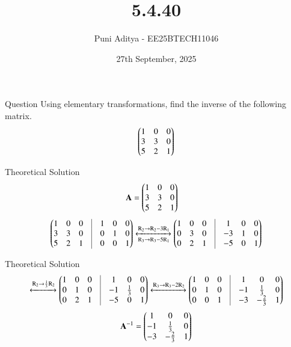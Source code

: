 \documentclass{beamer}
\title{5.4.40}
\date{27th September, 2025}
\author{Puni Aditya - EE25BTECH11046}
\begin{document}
\frame{\titlepage}
\begin{frame}{Question}
Using elementary transformations, find the inverse of the following matrix.
\begin{align*}
    \begin{pmatrix}1 & 0 & 0 \\ 3 & 3 & 0 \\ 5 & 2 & 1\end{pmatrix}
\end{align*}
\end{frame}

\begin{frame}{Theoretical Solution}
\begin{align}
    \mathbf{A} &= \begin{pmatrix}1 & 0 & 0 \\ 3 & 3 & 0 \\ 5 & 2 & 1\end{pmatrix}
\end{align}
\begin{align}
    \myvec{
        1 & 0 & 0 & \vrule & 1 & 0 & 0 \\
        3 & 3 & 0 & \vrule & 0 & 1 & 0 \\
        5 & 2 & 1 & \vrule & 0 & 0 & 1
    }
    \xleftrightarrow[\text{R}_3 \to \text{R}_3 - 5\text{R}_1]{\text{R}_2 \to \text{R}_2 - 3\text{R}_1}
    \myvec{
        1 & 0 & 0 & \vrule & 1 & 0 & 0 \\
        0 & 3 & 0 & \vrule & -3 & 1 & 0 \\
        0 & 2 & 1 & \vrule & -5 & 0 & 1
    }
\end{align}
\end{frame}

\begin{frame}{Theoretical Solution}
\begin{align}
    \xleftrightarrow{\text{R}_2 \to \frac{1}{3}\text{R}_2}
    \myvec{
        1 & 0 & 0 & \vrule & 1 & 0 & 0 \\
        0 & 1 & 0 & \vrule & -1 & \frac{1}{3} & 0 \\
        0 & 2 & 1 & \vrule & -5 & 0 & 1
    }
    \xleftrightarrow{\text{R}_3 \to \text{R}_3 - 2\text{R}_2}
    \myvec{
        1 & 0 & 0 & \vrule & 1 & 0 & 0 \\
        0 & 1 & 0 & \vrule & -1 & \frac{1}{3} & 0 \\
        0 & 0 & 1 & \vrule & -3 & -\frac{2}{3} & 1
    }
\end{align}
\begin{align}
    \mathbf{A}^{-1} = \begin{pmatrix}1 & 0 & 0 \\ -1 & \frac{1}{3} & 0 \\ -3 & -\frac{2}{3} & 1\end{pmatrix}
\end{align}
\end{frame}
\end{document}
